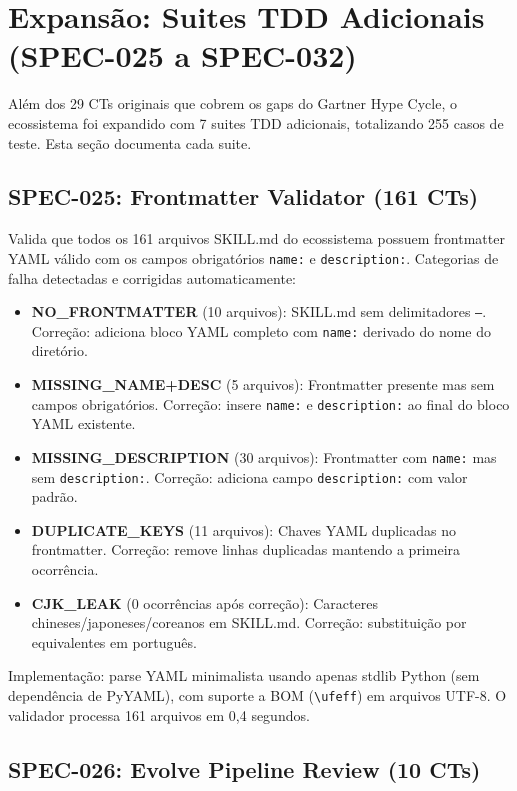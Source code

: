 \section{Expansão: Suites TDD Adicionais (SPEC-025 a SPEC-032)}

Além dos 29 CTs originais que cobrem os gaps do Gartner Hype Cycle, o ecossistema foi expandido com 7 suites TDD adicionais, totalizando 255 casos de teste. Esta seção documenta cada suite.

\subsection{SPEC-025: Frontmatter Validator (161 CTs)}

Valida que todos os 161 arquivos SKILL.md do ecossistema possuem frontmatter YAML válido com os campos obrigatórios \texttt{name:} e \texttt{description:}. Categorias de falha detectadas e corrigidas automaticamente:

\begin{itemize}
  \item \textbf{NO\_FRONTMATTER} (10 arquivos): SKILL.md sem delimitadores \texttt{---}. Correção: adiciona bloco YAML completo com \texttt{name:} derivado do nome do diretório.
  \item \textbf{MISSING\_NAME+DESC} (5 arquivos): Frontmatter presente mas sem campos obrigatórios. Correção: insere \texttt{name:} e \texttt{description:} ao final do bloco YAML existente.
  \item \textbf{MISSING\_DESCRIPTION} (30 arquivos): Frontmatter com \texttt{name:} mas sem \texttt{description:}. Correção: adiciona campo \texttt{description:} com valor padrão.
  \item \textbf{DUPLICATE\_KEYS} (11 arquivos): Chaves YAML duplicadas no frontmatter. Correção: remove linhas duplicadas mantendo a primeira ocorrência.
  \item \textbf{CJK\_LEAK} (0 ocorrências após correção): Caracteres chineses/japoneses/coreanos em SKILL.md. Correção: substituição por equivalentes em português.
\end{itemize}

Implementação: parse YAML minimalista usando apenas stdlib Python (sem dependência de PyYAML), com suporte a BOM (\texttt{\textbackslash ufeff}) em arquivos UTF-8. O validador processa 161 arquivos em 0,4 segundos.

\subsection{SPEC-026: Evolve Pipeline Review (10 CTs)}

